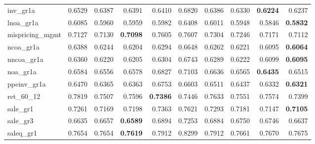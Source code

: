 \begin{longtable}{>{\raggedright\arraybackslash}p{2.6cm}rrrrrrrrr}
inv\_gr1a & 0.6529 & \cellcolor{blue!10}0.6387 & \cellcolor{blue!10}0.6391 & \cellcolor{blue!10}0.6410 & 0.6820 & \cellcolor{blue!10}0.6386 & \cellcolor{blue!10}0.6330 & \textbf{\cellcolor{blue!10}0.6224} & \cellcolor{blue!10}0.6237 \\
lnoa\_gr1a & 0.6085 & \cellcolor{blue!10}0.5960 & \cellcolor{blue!10}0.5959 & \cellcolor{blue!10}0.5982 & 0.6408 & \cellcolor{blue!10}0.6011 & \cellcolor{blue!10}0.5948 & \cellcolor{blue!10}0.5846 & \textbf{\cellcolor{blue!10}0.5832} \\
mispricing\_mgmt & 0.7127 & 0.7130 & \textbf{\cellcolor{blue!10}0.7098} & 0.7605 & 0.7607 & 0.7304 & 0.7246 & 0.7171 & \cellcolor{blue!10}0.7112 \\
ncoa\_gr1a & 0.6388 & \cellcolor{blue!10}0.6244 & \cellcolor{blue!10}0.6204 & \cellcolor{blue!10}0.6294 & 0.6648 & \cellcolor{blue!10}0.6262 & \cellcolor{blue!10}0.6221 & \cellcolor{blue!10}0.6095 & \textbf{\cellcolor{blue!10}0.6064} \\
nncoa\_gr1a & 0.6360 & \cellcolor{blue!10}0.6220 & \cellcolor{blue!10}0.6205 & \cellcolor{blue!10}0.6304 & 0.6743 & \cellcolor{blue!10}0.6289 & \cellcolor{blue!10}0.6222 & \cellcolor{blue!10}0.6099 & \textbf{\cellcolor{blue!10}0.6095} \\
noa\_gr1a & 0.6584 & \cellcolor{blue!10}0.6556 & \cellcolor{blue!10}0.6578 & 0.6827 & 0.7103 & 0.6636 & \cellcolor{blue!10}0.6565 & \textbf{\cellcolor{blue!10}0.6435} & \cellcolor{blue!10}0.6515 \\
ppeinv\_gr1a & 0.6470 & \cellcolor{blue!10}0.6365 & \cellcolor{blue!10}0.6363 & 0.6753 & 0.6603 & 0.6511 & \cellcolor{blue!10}0.6437 & \cellcolor{blue!10}0.6332 & \textbf{\cellcolor{blue!10}0.6321} \\
ret\_60\_12 & 0.7819 & \cellcolor{blue!10}0.7507 & \cellcolor{blue!10}0.7596 & \textbf{\cellcolor{blue!10}0.7386} & \cellcolor{blue!10}0.7446 & \cellcolor{blue!10}0.7633 & \cellcolor{blue!10}0.7551 & \cellcolor{blue!10}0.7574 & \cellcolor{blue!10}0.7399 \\
sale\_gr1 & 0.7261 & \cellcolor{blue!10}0.7169 & \cellcolor{blue!10}0.7198 & 0.7363 & 0.7621 & 0.7293 & \cellcolor{blue!10}0.7181 & \cellcolor{blue!10}0.7147 & \textbf{\cellcolor{blue!10}0.7105} \\
sale\_gr3 & 0.6635 & 0.6657 & \textbf{\cellcolor{blue!10}0.6589} & 0.6894 & 0.7253 & 0.6884 & 0.6750 & 0.6746 & 0.6637 \\
saleq\_gr1 & 0.7654 & 0.7654 & \textbf{\cellcolor{blue!10}0.7619} & 0.7912 & 0.8299 & 0.7912 & 0.7661 & 0.7670 & 0.7675 \\

\end{longtable}
